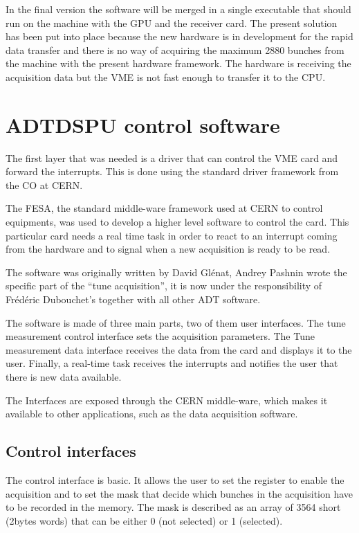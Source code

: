 In the final version the software will be merged in a single executable that should run on the machine with the \gls{GPU} and the receiver card. The present solution has been put into place because the new hardware is in development for the rapid data transfer and there is no way of acquiring the maximum 2880 bunches from the machine with the present hardware framework. The hardware is receiving the acquisition data but the \gls{VME} is not fast enough to transfer it to the \gls{CPU}.

\section{ADTDSPU control software}

The first layer that was needed is a driver that can control the \gls{VME} card and forward the interrupts. This is done using the standard driver framework from the \gls{CO} at \gls{CERN}.

The \gls{FESA}, the standard middle-ware framework used at \gls{CERN} to control equipments, was used to develop a higher level software to control the card. This particular card needs a real time task in order to react to an interrupt coming from the hardware and to signal when a new acquisition is ready to be read.

The software was originally written by David Gl{\'e}nat, Andrey Pashnin wrote the specific part of the ``tune acquisition'', it is now under the responsibility of Fr{\'e}d{\'e}ric Dubouchet's together with all other \gls{ADT} software.

The software is made of three main parts, two of them user interfaces. The tune measurement control interface sets the acquisition parameters. The Tune measurement data interface receives the data from the card and displays it to the user. Finally, a real-time task receives the interrupts and notifies the user that there is new data available.

The Interfaces are exposed through the \gls{CERN} middle-ware, which makes it available to other applications, such as the data acquisition software.

\subsection{Control interfaces}

The control interface is basic. It allows the user to set the register to enable the acquisition and to set the mask that decide which bunches in the acquisition have to be recorded in the memory. The mask is described as an array of 3564 short (2bytes words) that can be either 0 (not selected) or 1 (selected).


